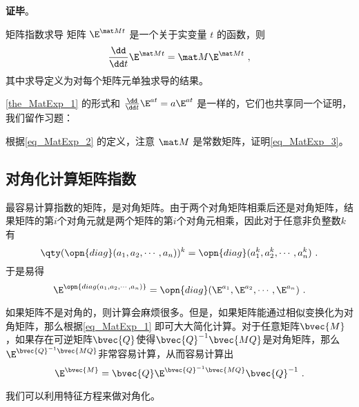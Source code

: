 \textbf{证毕}。





\begin{theorem}{矩阵指数求导}\label{the_MatExp_1}
矩阵 $\E^{\mat Mt}$ 是一个关于实变量 $t$ 的函数，则
\begin{equation}\label{eq_MatExp_3}
\frac{\dd}{\dd t}\E^{\mat Mt}=\mat M\E^{\mat Mt}~,
\end{equation}
其中求导定义为对每个矩阵元单独求导的结果。
\end{theorem}

\autoref{the_MatExp_1} 的形式和 $\frac{\dd}{\dd t}\E^{at}=a\E^{at}$ 是一样的，它们也共享同一个证明，我们留作习题：

\begin{exercise}{}
根据\autoref{eq_MatExp_2} 的定义，注意 $\mat M$ 是常数矩阵，证明\autoref{eq_MatExp_3}。
\end{exercise}





\subsection{对角化计算矩阵指数}



最容易计算指数的矩阵，是对角矩阵。由于两个对角矩阵相乘后还是对角矩阵，结果矩阵的第$i$个对角元就是两个矩阵的第$i$个对角元相乘，因此对于任意非负整数$k$有
\begin{equation}
\qty(\opn{diag}(a_1, a_2, \cdots, a_n))^k = \opn{diag}(a_1^k, a_2^k, \cdots, a_n^k)~. 
\end{equation}
于是易得
\begin{equation}
\E^{\opn{diag(a_1, a_2, \cdots, a_n)}} = \opn{diag}(\E^{a_1}, \E^{a_2}, \cdots, \E^{a_n})~. 
\end{equation}


如果矩阵不是对角的，则计算会麻烦很多。但是，如果矩阵能通过相似变换化为对角矩阵，那么根据\autoref{eq_MatExp_1} 即可大大简化计算。对于任意矩阵$\bvec{M}$，如果存在可逆矩阵$\bvec{Q}$使得$\bvec{Q}^{-1}\bvec{MQ}$是对角矩阵，那么$\E^{\bvec{Q}^{-1}\bvec{MQ}}$非常容易计算，从而容易计算出
\begin{equation}
\E^{\bvec{M}} = \bvec{Q}\E^{\bvec{Q}^{-1}\bvec{MQ}}\bvec{Q}^{-1}~. 
\end{equation}

我们可以利用特征方程来做对角化。










